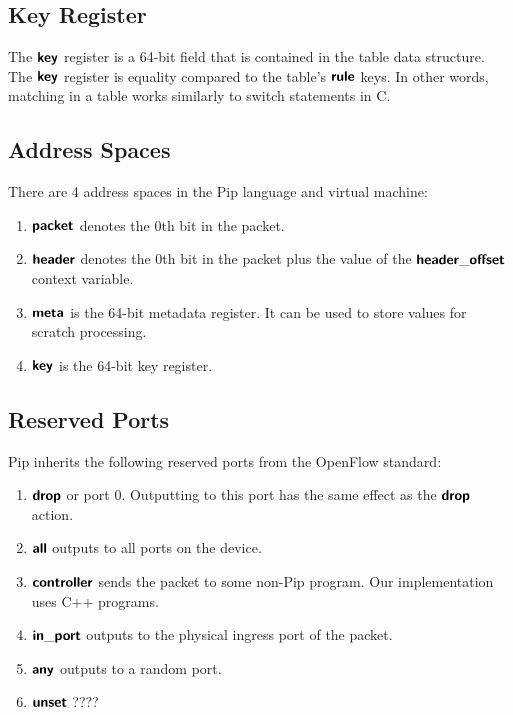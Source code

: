 \subsection{Key Register}
The $\bm{\mathsf{{key}}}$ register is a 64-bit field that is contained in the table data structure. The $\bm{\mathsf{{key}}}$ register is equality compared to the table's $\bm{\mathsf{{rule}}}$ keys. In other words, matching in a table works similarly to switch statements in C.

\subsection{Address Spaces}
There are 4 address spaces in the Pip language and virtual machine:
\begin{enumerate}
  \item $\bm{\mathsf{{packet}}}$ denotes the 0th bit in the packet.
  \item $\bm{\mathsf{{header}}}$ denotes the 0th bit in the packet plus the value of the $\bm{\mathsf{{header\_offset}}}$ context variable.
  \item $\bm{\mathsf{{meta}}}$ is the 64-bit metadata register. It can be used to store values for scratch processing.
  \item $\bm{\mathsf{{key}}}$ is the 64-bit key register.
\end{enumerate}

\subsection{Reserved Ports}
Pip inherits the following reserved ports from the OpenFlow standard:
\begin{enumerate}
  \item $\bm{\mathsf{{drop}}}$ or port 0. Outputting to this port has the same effect as the $\bm{\mathsf{{drop}}}$ action.
  \item $\bm{\mathsf{{all}}}$ outputs to all ports on the device.
  \item $\bm{\mathsf{{controller}}}$ sends the packet to some non-Pip program. Our implementation uses C++ programs.
  \item $\bm{\mathsf{{in\_port}}}$ outputs to the physical ingress port of the packet.
  \item $\bm{\mathsf{{any}}}$ outputs to a random port.
  \item $\bm{\mathsf{{unset}}}$ ????
\end{enumerate}


